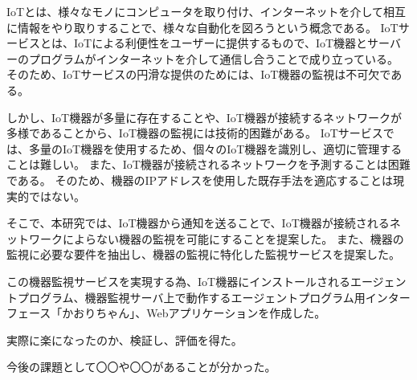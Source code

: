 IoTとは、様々なモノにコンピュータを取り付け、インターネットを介して相互に情報をやり取りすることで、様々な自動化を図ろうという概念である。
IoTサービスとは、IoTによる利便性をユーザーに提供するもので、IoT機器とサーバーのプログラムがインターネットを介して通信し合うことで成り立っている。
そのため、IoTサービスの円滑な提供のためには、IoT機器の監視は不可欠である。
\medskip

しかし、IoT機器が多量に存在することや、IoT機器が接続するネットワークが多様であることから、IoT機器の監視には技術的困難がある。
IoTサービスでは、多量のIoT機器を使用するため、個々のIoT機器を識別し、適切に管理することは難しい。
また、IoT機器が接続されるネットワークを予測することは困難である。
そのため、機器のIPアドレスを使用した既存手法を適応することは現実的ではない。
\medskip

そこで、本研究では、IoT機器から通知を送ることで、IoT機器が接続されるネットワークによらない機器の監視を可能にすることを提案した。
また、機器の監視に必要な要件を抽出し、機器の監視に特化した監視サービスを提案した。
\medskip

この機器監視サービスを実現する為、IoT機器にインストールされるエージェントプログラム、機器監視サーバ上で動作するエージェントプログラム用インターフェース「かおりちゃん」、Webアプリケーションを作成した。
\medskip

実際に楽になったのか、検証し、評価を得た。


今後の課題として〇〇や〇〇があることが分かった。




